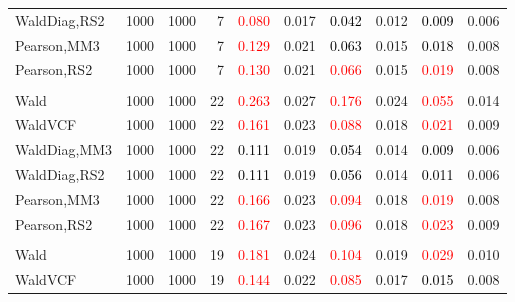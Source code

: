 \documentclass[
]{article}
\begin{document}
\begin{table}[H]
{\begin{tabular}[t]{lrrrrrrlrr}
\hspace{1em}WaldDiag,RS2 & 1000 & 1000 & 7 & \textcolor{red}{0.080} & 0.017 & \textcolor{black}{0.042} & 0.012 & \textcolor{black}{0.009} & 0.006\\
\hspace{1em}Pearson,MM3 & 1000 & 1000 & 7 & \textcolor{red}{0.129} & 0.021 & \textcolor{black}{0.063} & 0.015 & \textcolor{black}{0.018} & 0.008\\
\hspace{1em}Pearson,RS2 & 1000 & 1000 & 7 & \textcolor{red}{0.130} & 0.021 & \textcolor{red}{0.066} & 0.015 & \textcolor{red}{0.019} & 0.008\\
\addlinespace[0.3em]
\multicolumn{10}{l}{\textbf{1F 15V}}\\
\hspace{1em}Wald & 1000 & 1000 & 22 & \textcolor{red}{0.263} & 0.027 & \textcolor{red}{0.176} & 0.024 & \textcolor{red}{0.055} & 0.014\\
\hspace{1em}WaldVCF & 1000 & 1000 & 22 & \textcolor{red}{0.161} & 0.023 & \textcolor{red}{0.088} & 0.018 & \textcolor{red}{0.021} & 0.009\\
\hspace{1em}WaldDiag,MM3 & 1000 & 1000 & 22 & \textcolor{black}{0.111} & 0.019 & \textcolor{black}{0.054} & 0.014 & \textcolor{black}{0.009} & 0.006\\
\hspace{1em}WaldDiag,RS2 & 1000 & 1000 & 22 & \textcolor{black}{0.111} & 0.019 & \textcolor{black}{0.056} & 0.014 & \textcolor{black}{0.011} & 0.006\\
\hspace{1em}Pearson,MM3 & 1000 & 1000 & 22 & \textcolor{red}{0.166} & 0.023 & \textcolor{red}{0.094} & 0.018 & \textcolor{red}{0.019} & 0.008\\
\hspace{1em}Pearson,RS2 & 1000 & 1000 & 22 & \textcolor{red}{0.167} & 0.023 & \textcolor{red}{0.096} & 0.018 & \textcolor{red}{0.023} & 0.009\\
\addlinespace[0.3em]
\multicolumn{10}{l}{\textbf{2F 10V}}\\
\hspace{1em}Wald & 1000 & 1000 & 19 & \textcolor{red}{0.181} & 0.024 & \textcolor{red}{0.104} & 0.019 & \textcolor{red}{0.029} & 0.010\\
\hspace{1em}WaldVCF & 1000 & 1000 & 19 & \textcolor{red}{0.144} & 0.022 & \textcolor{red}{0.085} & 0.017 & \textcolor{black}{0.015} & 0.008\\

\end{tabular}}
\end{table}
\end{document}
